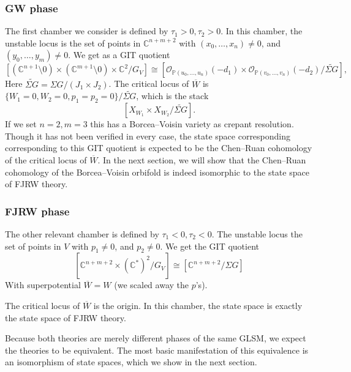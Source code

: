 \documentclass[10pt, letterpaper]{amsart}
\theoremstyle{remark}
\newcommand{\CC}{\mathbb C}
\newcommand{\PP}{\mathbb{P}}
\newcommand{\cO}{\mathcal{O}}
\newcommand{\set}[1]{\{#1\}}
\newcommand{\s}[1]{\Sigma #1}
\newcommand{\git}{\mathbin{
  \mathchoice{/\mkern-6mu/}%
    {/\mkern-6mu/}%
    {/\mkern-5mu/}%
    {/\mkern-5mu/}}}
\begin{document}


\subsubsection*{GW phase} The first chamber we consider is defined by $\tau_1>0, \tau_2>0$. In this chamber, the unstable locus is the set of points in $\CC^{n+m+2}$ with $(x_0,\dots,x_n)\neq 0$, and $(y_0,\dots,y_m)\neq 0$. We get as a GIT quotient 
\[
\left[(\CC^{n+1}\setminus 0)\times (\CC^{m+1}\setminus 0)\times \CC^2/G_V\right]\cong \left[\cO_{\PP(u_0,\dots,u_n)}(-d_1)\times \cO_{\PP(v_0,\dots,v_n)}(-d_2)/\widetilde{\s{G}}\right],%
\]
Here $\widetilde{\s{G}}=\s{G}/(J_1\times J_2)$. The critical locus of $\overline{W}$ is $\set{W_1=0,W_2=0, p_1=p_2=0}/\widetilde{\s{G}}$, which is the stack 
\[
\left[X_{W_1}\times X_{W_2}/\widetilde{\s{G}} \right].
\]
If we set $n=2, m=3$ this has a Borcea--Voisin variety as crepant resolution. Though it has not been verified in every case, the state space corresponding corresponding to this GIT quotient is expected to be the Chen--Ruan cohomology of the critical locus of $\overline{W}$. In the next section, we will show that the Chen--Ruan cohomology of the Borcea--Voisin orbifold is indeed isomorphic to the state space of FJRW theory.   



\subsubsection*{FJRW phase} The other relevant chamber is defined by $\tau_1<0, \tau_2<0$. The unstable locus the set of points in $V$ with $p_1\neq 0$, and $p_2\neq 0$. We get the GIT quotient 
\[
\left[\CC^{n+m+2}\times (\CC^*)^2/G_V\right]\cong [\CC^{n+m+2}/\s{G}] 
\]
With superpotential $\overline{W}=W$ (we scaled away the $p$'s).

The critical locus of $\overline{W}$ is the origin. In this chamber, the state space is exactly the state space of FJRW theory.   

Because both theories are merely different phases of the same GLSM, we expect the theories to be equivalent. The most basic manifestation of this equivalence is an isomorphism of state spaces, which we show in the next section.    
\end{document}
